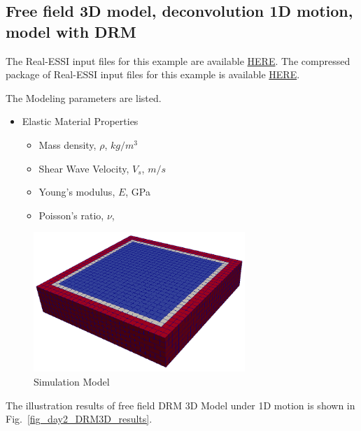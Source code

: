 \subsection{Free field 3D model, deconvolution 1D motion, model with DRM}
\label{Free_fields_3D_model_with_DRM1}


The Real-ESSI input files for this example are available 
\href{http://sokocalo.engr.ucdavis.edu/~jeremic/lecture_notes_online_material/_Chapter_Short_Course_Examples/Day2/Deconvolution_1D_Motions/Free_fields_3D_model_with_DRM}{HERE}. 
The compressed package of Real-ESSI input files for this example is available 
\href{http://sokocalo.engr.ucdavis.edu/~jeremic/lecture_notes_online_material/_Chapter_Short_Course_Examples/Day2/Deconvolution_1D_Motions/Free_fields_3D_model_with_DRM/_all_files_packaged_for_Free_fields_3D_model_with_DRM.tar.gz}{HERE}. 

The Modeling parameters are listed.
\begin{itemize}
  \item Elastic Material Properties 
  \begin{itemize}
    \item Mass density, $\rho$, \enspace {} $kg/m^3$
    \item Shear Wave Velocity, $V_s$, \enspace {} $m/s$
    \item Young's modulus, $E$, \enspace {} GPa
    \item Poisson's ratio, $\nu$, \enspace {}
  \end{itemize}
\end{itemize}


\begin{figure}[H]
  \centering
  \includegraphics[width = 8cm]{./Figure-files/Day2/Deconvolution_1D_Motions/Free_fields_3D_model_with_DRM/overview.png}
  \caption{Simulation Model}
  \label{fig_decon_1D_motion_3D_model1}
\end{figure}


The illustration results of free field DRM 3D Model under 1D motion is shown 
in Fig.~\ref{fig_day2_DRM3D_results}. 

